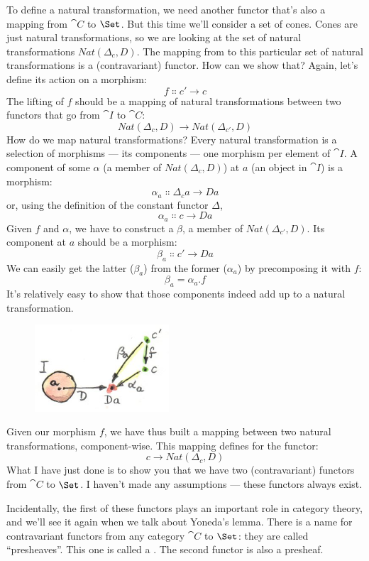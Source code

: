 \noindent
To define a natural transformation, we need another functor that's also
a mapping from $\cat{C}$ to $\Set$. But this time we'll consider a
set of cones. Cones are just natural transformations, so we are looking
at the set of natural transformations $Nat(\Delta_c, D)$. The mapping
from  to this particular set of natural transformations is a
(contravariant) functor. How can we show that? Again, let's define its
action on a morphism:
\[f \Colon c' \to c\]
The lifting of $f$ should be a mapping of natural transformations
between two functors that go from $\cat{I}$ to $\cat{C}$:
\[Nat(\Delta_c, D) \to Nat(\Delta_{c'}, D)\]
How do we map natural transformations? Every natural transformation is a
selection of morphisms --- its components --- one morphism per element
of $\cat{I}$. A component of some $\alpha$ (a member of $Nat(\Delta_c, D)$) at
$a$ (an object in $\cat{I}$) is a morphism:
\[\alpha_a \Colon \Delta_c a \to D a\]
or, using the definition of the constant functor $\Delta$,
\[\alpha_a \Colon c \to D a\]
Given $f$ and $\alpha$, we have to construct a $\beta$, a member of
$Nat(\Delta_{c'}, D)$. Its component at $a$ should be a
morphism:
\[\beta_a \Colon c' \to D a\]
We can easily get the latter ($\beta_a$) from the former ($\alpha_a$) by precomposing it with
$f$:
\[\beta_a = \alpha_a . f\]
It's relatively easy to show that those components indeed add up to a
natural transformation.

\begin{figure}[H]
\centering
\includegraphics[width=50mm]{images/natmapping.jpg}
\end{figure}

\noindent
Given our morphism $f$, we have thus built a mapping between two
natural transformations, component-wise. This mapping defines
 for the functor:
\[c \to Nat(\Delta_c, D)\]
What I have just done is to show you that we have two (contravariant)
functors from $\cat{C}$ to $\Set$. I haven't made any assumptions
--- these functors always exist.

Incidentally, the first of these functors plays an important role in
category theory, and we'll see it again when we talk about Yoneda's
lemma. There is a name for contravariant functors from any category
$\cat{C}$ to $\Set$: they are called ``presheaves''. This one is
called a . The second functor is also a
presheaf.

